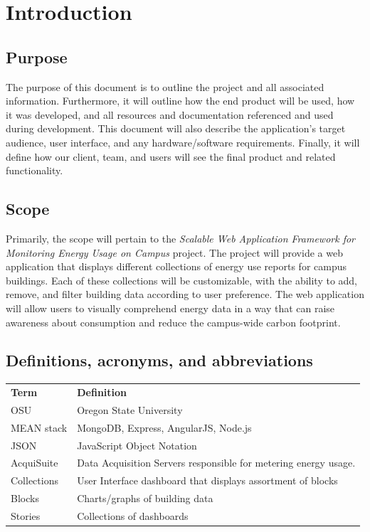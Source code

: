 \documentclass[onecolumn, draftclsnofoot,10pt, compsoc]{IEEEtran}
\begin{document}
    \section{Introduction}
    \subsection{Purpose}
	The purpose of this document is to outline the project and all associated information. Furthermore, it will outline how the end product will be used, how it was developed, and all resources and documentation referenced and used during development. This document will also describe the application’s target audience, user interface, and any hardware/software requirements. Finally, it will define how our client, team, and users will see the final product and related functionality.
    \subsection{Scope}
    Primarily, the scope will pertain to the \textit{Scalable Web Application Framework for Monitoring Energy Usage on Campus}  project. The project will provide a web application that displays different collections of energy use reports for campus buildings. Each of these collections will be customizable, with the ability to add, remove, and filter building data according to user preference. The web application will allow users to visually comprehend energy data in a way that can raise awareness about consumption and reduce the campus-wide carbon footprint.
    
    \subsection{Definitions, acronyms, and abbreviations} \label{definition}
	\begin{table}[h]
	\centering
	
	\begin{tabular}{ll}
	\textbf{Term} & \textbf{Definition} \\
	OSU & Oregon State University \\
	MEAN stack & MongoDB, Express, AngularJS, Node.js \\
	JSON & JavaScript Object Notation \\
	AcquiSuite & Data Acquisition Servers responsible for metering energy usage. \\
	Collections & User Interface dashboard that displays assortment of blocks \\
    Blocks & Charts/graphs of building data \\
    Stories & Collections of dashboards 
	\end{tabular}
	\end{table}
\end{document}

